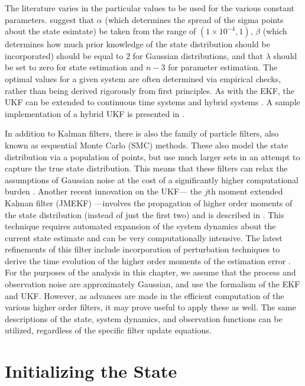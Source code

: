 The literature varies in the particular values to be used for the various constant parameters.  \citet{van2001square} suggest that $\alpha$ (which determines the spread of the sigma points about the state esimtate) be taken from the range of $(1\times10^{-4}, 1)$, $\beta$ (which determines how much prior knowledge of the state distribution should be incorporated) should be equal to 2 for Gaussian distributions, and that $\lambda$ should be set to zero for state estimation and $n - 3$ for parameter estimation.  The optimal values for a given system are often determined via empirical checks, rather than being derived rigorously from first principles.  As with the EKF, the UKF can be extended to continuous time systems and hybrid systems \citep{sarkka2007unscented}.  A sample implementation of a hybrid UKF is presented in .

In addition to Kalman filters, there is also the family of particle filters, also known as sequential Monte Carlo (SMC) methods.  These also model the state distribution via a population of points, but use much larger sets in an attempt to capture the true state distribution.  This means that these filters can relax the assumptions of Gaussian noise at the cost of a significantly higher computational burden \citep{van2001unscented,ng2005continuous}. Another recent innovation on the UKF--- the $j$th moment extended Kalman filter (JMEKF) ---involves the propagation of higher order moments of the state distribution (instead of just the first two) and is described in \citet{majji2008high}.  This technique requires automated expansion of the system dynamics about the current state estimate and can be very computationally intensive.  The latest refinements of this filter include incorporation of perturbation techniques to derive the time evolution of the higher order moments of the estimation error \citep{majji2010perturbation}.  For the purposes of the analysis in this chapter, we assume that the process and observation noise are approximately Gaussian, and use the formalism of the EKF and UKF.  However, as advances are made in the efficient computation of the various higher order filters, it may prove useful to apply these as well.  The same descriptions of the state, system dynamics, and observation functions can be utilized, regardless of the specific filter update equations.

\section{Initializing the State}\label{sec:state_init}
